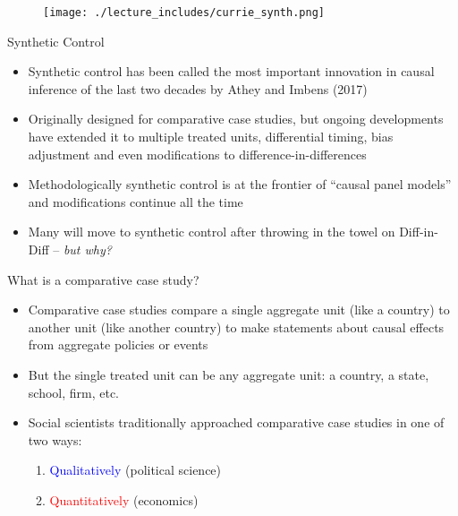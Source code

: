 \documentclass{beamer}
\begin{document}
\begin{frame}[plain]
	\begin{figure}
	\texttt{[image: ./lecture\_includes/currie\_synth.png]}
	\end{figure}
\end{frame}

\begin{frame}{Synthetic Control}
	
	\begin{itemize}
	\item Synthetic control has been called the most important innovation in causal inference of the last two decades by Athey and Imbens (2017)
	\item Originally designed for comparative case studies, but ongoing developments have extended it to multiple treated units, differential timing, bias adjustment and even modifications to difference-in-differences
	\item Methodologically synthetic control is at the frontier of ``causal panel models'' and modifications continue all the time
	\item Many will move to synthetic control after throwing in the towel on Diff-in-Diff -- \emph{but why?}
	\end{itemize}
\end{frame}
	
\begin{frame}{What is a comparative case study?}

\begin{itemize}
\item Comparative case studies compare a single aggregate unit (like a country) to another unit (like another country) to make statements about causal effects from aggregate policies or events
\item But the single treated unit can be any aggregate unit: a country, a state, school, firm, etc. 
\item Social scientists traditionally approached comparative case studies in one of two ways:
	\begin{enumerate}
	\item \textcolor{blue}{Qualitatively} (political science)
	\item \textcolor{red}{Quantitatively} (economics)
	\end{enumerate}
\end{itemize}

\end{frame}
\end{document}
